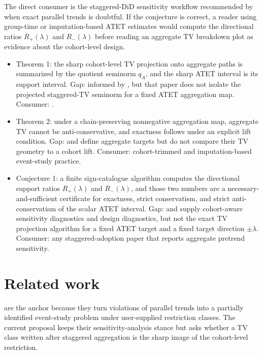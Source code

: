 \documentclass[11pt]{article}
\theoremstyle{definition}
\theoremstyle{plain}
\theoremstyle{remark}
\begin{document}
The direct consumer is the staggered-DiD sensitivity workflow recommended by \citet{RothSantAnnaBilinskiPoe2023TrendingDiD} when exact parallel trends is doubtful. If the conjecture is correct, a reader using group-time or imputation-based ATET estimates would compute the directional ratios \(R_+(\lambda)\) and \(R_-(\lambda)\) before reading an aggregate TV breakdown plot as evidence about the cohort-level design.

\begin{itemize}[leftmargin=*]
\item Theorem 1: the sharp cohort-level TV projection onto aggregate paths is summarized by the quotient seminorm \(q_A\), and the sharp ATET interval is its support interval. Gap: informed by \citet{RambachanRoth2023CrediblePT}, but that paper does not isolate the projected staggered-TV seminorm for a fixed ATET aggregation map. Consumer: \citet{RothSantAnnaBilinskiPoe2023TrendingDiD}.
\item Theorem 2: under a chain-preserving nonnegative aggregation map, aggregate TV cannot be anti-conservative, and exactness follows under an explicit lift condition. Gap: \citet{CallawaySantAnna2021MultiplePeriods} and \citet{BorusyakJaravelSpiess2024EventStudies} define aggregate targets but do not compare their TV geometry to a cohort lift. Consumer: cohort-trimmed and imputation-based event-study practice.
\item Conjecture 1: a finite sign-catalogue algorithm computes the directional support ratios \(R_+(\lambda)\) and \(R_-(\lambda)\), and those two numbers are a necessary-and-sufficient certificate for exactness, strict conservatism, and strict anti-conservatism of the scalar ATET interval. Gap: \citet{Liu2025CohortAnchored} and \citet{Wright2026DesignRobust} supply cohort-aware sensitivity diagnostics and design diagnostics, but not the exact TV projection algorithm for a fixed ATET target and a fixed target direction \(\pm\lambda\). Consumer: any staggered-adoption paper that reports aggregate pretrend sensitivity.
\end{itemize}

\section{Related work}
\citet{RambachanRoth2023CrediblePT} are the anchor because they turn violations of parallel trends into a partially identified event-study problem under user-supplied restriction classes. The current proposal keeps their sensitivity-analysis stance but asks whether a TV class written after staggered aggregation is the sharp image of the cohort-level restriction.
\end{document}
